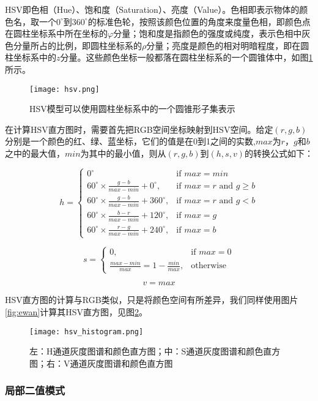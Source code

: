   HSV即色相（Hue）、饱和度（Saturation）、亮度（Value）。色相即表示物体的颜色名，取一个$0^{\circ}$到$360^{\circ}$的标准色轮，按照该颜色位置的角度来度量色相，即颜色点在圆柱坐标系中所在坐标的$\varphi$分量；饱和度是指颜色的强度或纯度，表示色相中灰色分量所占的比例，即圆柱坐标系的$\rho$分量；亮度是颜色的相对明暗程度，即在圆柱坐标系中的$z$分量。这些颜色坐标一般都落在圆柱坐标系的一个圆锥体中，如图\ref{fig:hsv}所示。

\begin{figure}[htb]
  \centering
  \texttt{[image: hsv.png]}
  \caption{HSV模型可以使用圆柱坐标系中的一个圆锥形子集表示}
  \label{fig:hsv}
\end{figure}

  在计算HSV直方图时，需要首先把RGB空间坐标映射到HSV空间。给定$(r,g,b)$分别是一个颜色的红、绿、蓝坐标，它们的值是在0到1之间的实数,$max$为$r$，$g$和$b$之中的最大值，$min$为其中的最小值，则从$(r,g,b)$到$(h,s,v)$的转换公式如下：\cite{foley1982fundamentals}

$$h={\begin{cases}0^{\circ }&{\mbox{if }}max=min\\60^{\circ }\times {\frac  {g-b}{max-min}}+0^{\circ },&{\mbox{if }}max=r{\mbox{ and }}g\geq b\\60^{\circ }\times {\frac  {g-b}{max-min}}+360^{\circ },&{\mbox{if }}max=r{\mbox{ and }}g<b\\60^{\circ }\times {\frac  {b-r}{max-min}}+120^{\circ },&{\mbox{if }}max=g\\60^{\circ }\times {\frac  {r-g}{max-min}}+240^{\circ },&{\mbox{if }}max=b\end{cases}}$$

$$s={\begin{cases}0,&{\mbox{if }}max=0\\{\frac  {max-min}{max}}=1-{\frac  {min}{max}},&{\mbox{otherwise}}\end{cases}}$$

$$
v=max
$$

  HSV直方图的计算与RGB类似，只是将颜色空间有所差异，我们同样使用图片\ref{fig:ewan}计算其HSV直方图，见图\ref{fig:hsvhistogram}。

\begin{figure}[htb]
  \centering
  \texttt{[image: hsv\_histogram.png]}
  \caption{左：H通道灰度图谱和颜色直方图；中：S通道灰度图谱和颜色直方图；右：V通道灰度图谱和颜色直方图}
  \label{fig:hsvhistogram}
\end{figure}

\subsubsection{局部二值模式}

